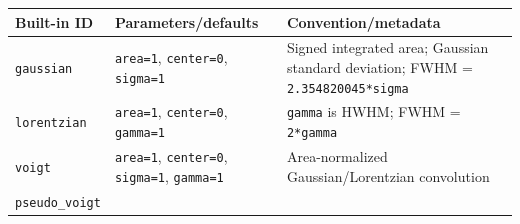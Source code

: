 \documentclass[
  10pt,
  a4paper,
  oneside]{scrreprt}
\begin{document}
\begin{longtable}[]{@{}lll@{}}
\toprule
\begin{minipage}[b]{0.30\columnwidth}\raggedright
Built-in ID\strut
\end{minipage} & \begin{minipage}[b]{0.30\columnwidth}\raggedright
Parameters/defaults\strut
\end{minipage} & \begin{minipage}[b]{0.30\columnwidth}\raggedright
Convention/metadata\strut
\end{minipage}\tabularnewline
\midrule
\endhead
\begin{minipage}[t]{0.30\columnwidth}\raggedright
\texttt{gaussian}\strut
\end{minipage} & \begin{minipage}[t]{0.30\columnwidth}\raggedright
\texttt{area=1}, \texttt{center=0}, \texttt{sigma=1}\strut
\end{minipage} & \begin{minipage}[t]{0.30\columnwidth}\raggedright
Signed integrated area; Gaussian standard deviation; FWHM =
\texttt{2.354820045*sigma}\strut
\end{minipage}\tabularnewline
\begin{minipage}[t]{0.30\columnwidth}\raggedright
\texttt{lorentzian}\strut
\end{minipage} & \begin{minipage}[t]{0.30\columnwidth}\raggedright
\texttt{area=1}, \texttt{center=0}, \texttt{gamma=1}\strut
\end{minipage} & \begin{minipage}[t]{0.30\columnwidth}\raggedright
\texttt{gamma} is HWHM; FWHM = \texttt{2*gamma}\strut
\end{minipage}\tabularnewline
\begin{minipage}[t]{0.30\columnwidth}\raggedright
\texttt{voigt}\strut
\end{minipage} & \begin{minipage}[t]{0.30\columnwidth}\raggedright
\texttt{area=1}, \texttt{center=0}, \texttt{sigma=1},
\texttt{gamma=1}\strut
\end{minipage} & \begin{minipage}[t]{0.30\columnwidth}\raggedright
Area-normalized Gaussian/Lorentzian convolution\strut
\end{minipage}\tabularnewline
\begin{minipage}[t]{0.30\columnwidth}\raggedright
\texttt{pseudo\_voigt}\strut
\end{minipage} & \begin{minipage}[t]{0.30\columnwidth}\raggedright

\end{minipage}
\end{longtable}
\end{document}
